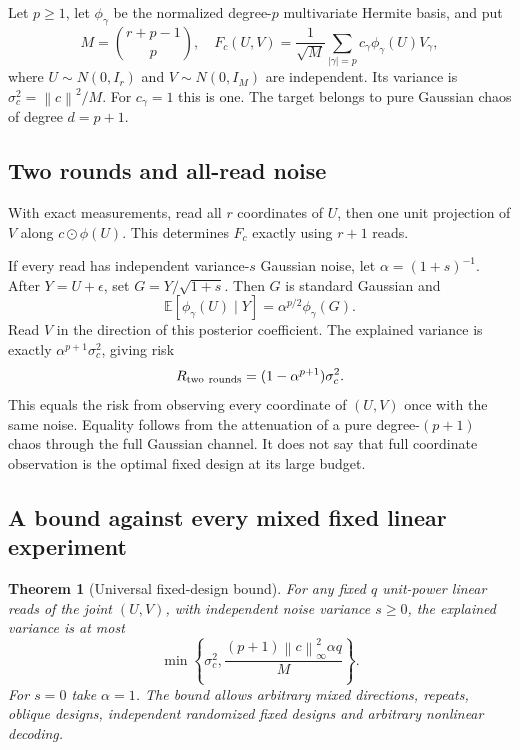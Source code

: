 \documentclass[11pt]{article}
\newcommand{\E}{\mathbb E}
\newcommand{\norm}[1]{\left\lVert#1\right\rVert}
\newtheorem{theorem}{Theorem}
\begin{document}
Let $p\ge1$, let $\phi_\gamma$ be the normalized degree-$p$ multivariate Hermite basis, and put
\[
M=\binom{r+p-1}{p},\quad
F_c(U,V)=\frac1{\sqrt M}\sum_{|\gamma|=p}c_\gamma\phi_\gamma(U)V_\gamma,
\]
where $U\sim N(0,I_r)$ and $V\sim N(0,I_M)$ are independent. Its variance is $\sigma_c^2=\norm{c}^2/M$. For $c_\gamma=1$ this is one. The target belongs to pure Gaussian chaos of degree $d=p+1$.

\subsection{Two rounds and all-read noise}

With exact measurements, read all $r$ coordinates of $U$, then one unit projection of $V$ along $c\odot\phi(U)$. This determines $F_c$ exactly using $r+1$ reads.

If every read has independent variance-$s$ Gaussian noise, let $\alpha=(1+s)^{-1}$. After $Y=U+\epsilon$, set $G=Y/\sqrt{1+s}$. Then $G$ is standard Gaussian and
\[
\E[\phi_\gamma(U)\mid Y]=\alpha^{p/2}\phi_\gamma(G).
\]
Read $V$ in the direction of this posterior coefficient. The explained variance is exactly $\alpha^{p+1}\sigma_c^2$, giving risk
\begin{equation}
R_{\rm two\ rounds}=(1-\alpha^{p+1})\sigma_c^2.
\label{eq:tworound}
\end{equation}
This equals the risk from observing every coordinate of $(U,V)$ once with the same noise. Equality follows from the attenuation of a pure degree-$(p+1)$ chaos through the full Gaussian channel. It does not say that full coordinate observation is the optimal fixed design at its large budget.

\subsection{A bound against every mixed fixed linear experiment}

\begin{theorem}[Universal fixed-design bound]
For any fixed $q$ unit-power linear reads of the joint $(U,V)$, with independent noise variance $s\ge0$, the explained variance is at most
\begin{equation}
\min\!\left\{\sigma_c^2,\frac{(p+1)\norm{c}_\infty^2\alpha q}{M}\right\}.
\label{eq:fixed}
\end{equation}
For $s=0$ take $\alpha=1$. The bound allows arbitrary mixed directions, repeats, oblique designs, independent randomized fixed designs and arbitrary nonlinear decoding.
\end{theorem}
\end{document}
